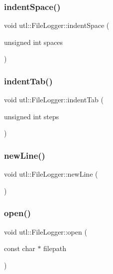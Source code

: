 \subsubsection{\texorpdfstring{indent\+Space()}{indentSpace()}}
{\footnotesize\ttfamily void utl\+::\+File\+Logger\+::indent\+Space (\begin{DoxyParamCaption}\item[{unsigned int}]{spaces }\end{DoxyParamCaption})}

\mbox{\label{classutl_1_1_file_logger_a160943debc1ae1af4bf9f6a29597d65a}} 
\subsubsection{\texorpdfstring{indent\+Tab()}{indentTab()}}
{\footnotesize\ttfamily void utl\+::\+File\+Logger\+::indent\+Tab (\begin{DoxyParamCaption}\item[{unsigned int}]{steps }\end{DoxyParamCaption})}

\mbox{\label{classutl_1_1_file_logger_a5f1849d0a5959eca4eeb3ecc94b6d2ca}} 
\subsubsection{\texorpdfstring{new\+Line()}{newLine()}}
{\footnotesize\ttfamily void utl\+::\+File\+Logger\+::new\+Line (\begin{DoxyParamCaption}{ }\end{DoxyParamCaption})}

\mbox{\label{classutl_1_1_file_logger_ae6d5cb6373539a82bb3454f096dabffa}} 
\subsubsection{\texorpdfstring{open()}{open()}}
{\footnotesize\ttfamily void utl\+::\+File\+Logger\+::open (\begin{DoxyParamCaption}\item[{const char $\ast$}]{filepath }\end{DoxyParamCaption})}

